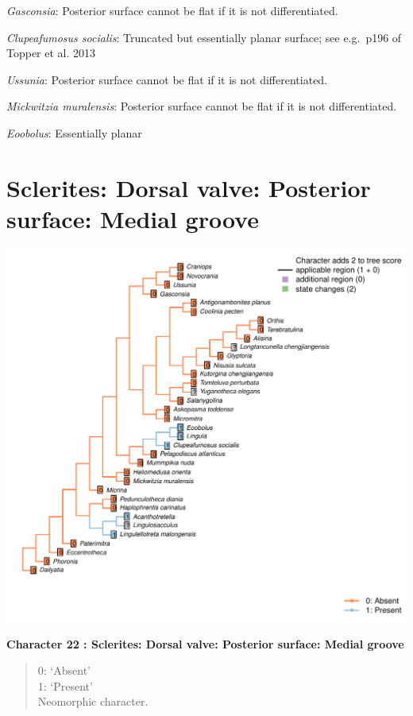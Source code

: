 \documentclass[]{book}
\theoremstyle{definition}
\theoremstyle{definition}
\theoremstyle{definition}
\theoremstyle{remark}
\begin{document}
\emph{Gasconsia}: Posterior surface cannot be flat if it is not
differentiated.

\emph{Clupeafumosus socialis}: Truncated but essentially planar surface;
see e.g.~p196 of Topper et al. 2013

\emph{Ussunia}: Posterior surface cannot be flat if it is not
differentiated.

\emph{Mickwitzia muralensis}: Posterior surface cannot be flat if it is
not differentiated.

\emph{Eoobolus}: Essentially planar

\hypertarget{sclerites-dorsal-valve-posterior-surface-medial-groove}{%
\section*{Sclerites: Dorsal valve: Posterior surface: Medial
groove}\label{sclerites-dorsal-valve-posterior-surface-medial-groove}}

\includegraphics{Brachiopod_phylogeny_files/figure-latex/unnamed-chunk-5-22.pdf}

\textbf{Character 22 : Sclerites: Dorsal valve: Posterior surface:
Medial groove }

\begin{quote}
0: `Absent'\\
1: `Present'\\
Neomorphic character.
\end{quote}
\end{document}
